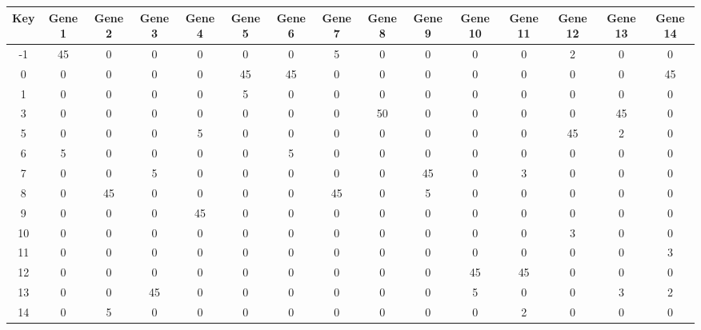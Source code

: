 \begin{tabular}{|c|c|c|c|c|c|c|c|c|c|c|c|c|c|c|}
\hline
Key & Gene 1 & Gene 2 & Gene 3 & Gene 4 & Gene 5 & Gene 6 & Gene 7 & Gene 8 & Gene 9 & Gene 10 & Gene 11 & Gene 12 & Gene 13 & Gene 14 \\
\hline
-1 & 45 & 0 & 0 & 0 & 0 & 0 & 5 & 0 & 0 & 0 & 0 & 2 & 0 & 0 \\
0 & 0 & 0 & 0 & 0 & 45 & 45 & 0 & 0 & 0 & 0 & 0 & 0 & 0 & 45 \\
1 & 0 & 0 & 0 & 0 & 5 & 0 & 0 & 0 & 0 & 0 & 0 & 0 & 0 & 0 \\
3 & 0 & 0 & 0 & 0 & 0 & 0 & 0 & 50 & 0 & 0 & 0 & 0 & 45 & 0 \\
5 & 0 & 0 & 0 & 5 & 0 & 0 & 0 & 0 & 0 & 0 & 0 & 45 & 2 & 0 \\
6 & 5 & 0 & 0 & 0 & 0 & 5 & 0 & 0 & 0 & 0 & 0 & 0 & 0 & 0 \\
7 & 0 & 0 & 5 & 0 & 0 & 0 & 0 & 0 & 45 & 0 & 3 & 0 & 0 & 0 \\
8 & 0 & 45 & 0 & 0 & 0 & 0 & 45 & 0 & 5 & 0 & 0 & 0 & 0 & 0 \\
9 & 0 & 0 & 0 & 45 & 0 & 0 & 0 & 0 & 0 & 0 & 0 & 0 & 0 & 0 \\
10 & 0 & 0 & 0 & 0 & 0 & 0 & 0 & 0 & 0 & 0 & 0 & 3 & 0 & 0 \\
11 & 0 & 0 & 0 & 0 & 0 & 0 & 0 & 0 & 0 & 0 & 0 & 0 & 0 & 3 \\
12 & 0 & 0 & 0 & 0 & 0 & 0 & 0 & 0 & 0 & 45 & 45 & 0 & 0 & 0 \\
13 & 0 & 0 & 45 & 0 & 0 & 0 & 0 & 0 & 0 & 5 & 0 & 0 & 3 & 2 \\
14 & 0 & 5 & 0 & 0 & 0 & 0 & 0 & 0 & 0 & 0 & 2 & 0 & 0 & 0 \\
\hline
\end{tabular}